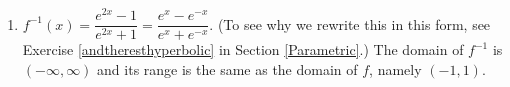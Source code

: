\begin{enumerate}
\setcounter{enumi}{\value{HW}}
\addtocounter{enumi}{1}

\item $f^{-1}(x) = \dfrac{e^{2x} - 1}{e^{2x} + 1} = \dfrac{e^{x} - e^{-x}}{e^{x} + e^{-x}}$. (To see why we rewrite this in this form, see  Exercise \ref{andtheresthyperbolic} in Section \ref{Parametric}.)  The domain of $f^{-1}$ is $(-\infty, \infty)$ and its range is the same as the domain of $f$, namely $(-1, 1)$.

\end{enumerate}

\closegraphsfile